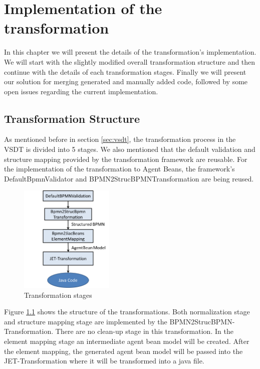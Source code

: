 \chapter{Implementation of the transformation}
\label{chap:implementation}
In this chapter we will present the details of the transformation's implementation. We will start with the slightly modified overall transformation structure and then continue with the details of each transformation stages. Finally we will present our solution for merging generated and manually added code, followed by some open issues regarding the current implementation.

\section{Transformation Structure}
As mentioned before in section \ref{sec:vsdt}, the transformation process in the VSDT is divided into 5 stages. We also mentioned that the default validation and structure mapping provided by the transformation framework are reusable. For the implementation of the transformation to Agent Beans, the framework's DefaultBpmnValidator and BPMN2StrucBPMNTransformation are being reused.

\begin{figure}[h]
	\centering	\includegraphics[width=0.4\textwidth]{images/implementation_stages.png}
	\caption{Transformation stages}
	\label{fig:implementation_stages}
\end{figure}

Figure \ref{fig:implementation_stages} shows the structure of the transformations. Both normalization stage and structure mapping stage are implemented by the BPMN2StrucBPMN-Transformation. There are no clean-up stage in this transformation. In the element mapping stage an intermediate agent bean model will be created. After the element mapping, the generated agent bean model will be passed into the JET-Transformation where it will be transformed into a java file.

